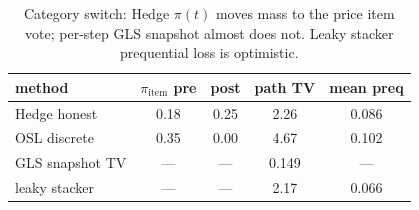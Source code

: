 \begin{table}[t]\centering
\caption{Category switch: Hedge $\pi(t)$ moves mass to the price item vote; per-step GLS snapshot almost does not. Leaky stacker prequential loss is optimistic.}
\label{tab:agod-tower-stack-switch}
\begin{tabular}{lcccc}\toprule
method & $\pi_{\mathrm{item}}$ pre & post & path TV & mean preq \\
\midrule
Hedge honest & 0.18 & 0.25 & 2.26 & 0.086 \\
OSL discrete & 0.35 & 0.00 & 4.67 & 0.102 \\
GLS snapshot TV & --- & --- & 0.149 & --- \\
leaky stacker & --- & --- & 2.17 & 0.066 \\
\bottomrule
\end{tabular}
\end{table}
